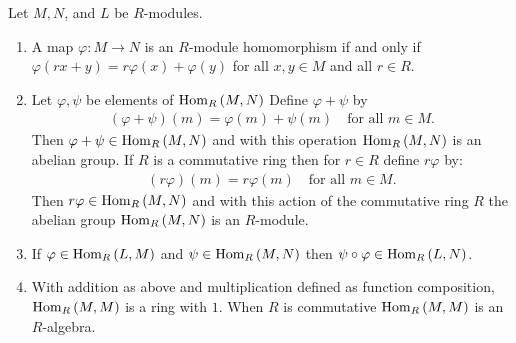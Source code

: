     \begin{proposition}\label{prop:properties-of-hom}
        Let $M,N$, and $L$ be $R$-modules.
        \begin{enumerate}[label = (\arabic*)]
            \item A map $\varphi:M \rightarrow N$ is an $R$-module homomorphism if and only if $\varphi(rx+y) = r\varphi(x) + \varphi(y)$ for all $x,y \in M$ and all $r \in R$.
            \item Let $\varphi, \psi$ be elements of $\operatorname{Hom}_R{(M,N)}$ Define $\varphi + \psi$ by 
                \begin{equation*}
                \begin{split}
                    (\varphi+\psi)(m) = \varphi(m) + \psi(m) \quad \text{for all $m \in M$}.
                \end{split}
                \end{equation*}
            Then $\varphi + \psi \in \operatorname{Hom}_R{(M,N)}$ and with this operation $\operatorname{Hom}_R{(M,N)}$ is an abelian group. If $R$ is a commutative ring then for $r \in R$ define $r\varphi$ by:
                \begin{equation*}
                \begin{split}
                    (r\varphi)(m) = r\varphi(m) \quad \text{for all $m \in M$}.
                \end{split}
                \end{equation*}
            Then $r\varphi \in \operatorname{Hom}_R{(M,N)}$ and with this action of the commutative ring $R$ the abelian group $\operatorname{Hom}_R{(M,N)}$ is an $R$-module.
            \item If $\varphi \in \operatorname{Hom}_R{(L,M)}$ and $\psi \in \operatorname{Hom}_R{(M,N)}$ then $\psi \circ \varphi \in \operatorname{Hom}_R{(L,N)}$.
            \item With addition as above and multiplication defined as function composition, $\operatorname{Hom}_R{(M,M)}$ is a ring with $1$. When $R$ is commutative $\operatorname{Hom}_R{(M,M)}$ is an $R$-algebra.
        \end{enumerate}
    \end{proposition}
